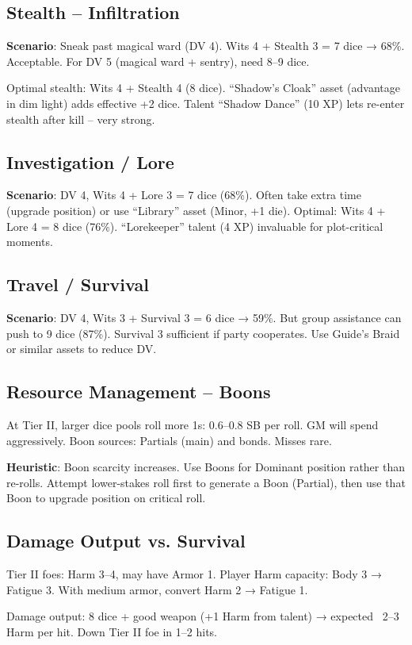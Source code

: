 \documentclass[11pt]{article}
\begin{document}
\subsection{Stealth – Infiltration}
\textbf{Scenario}: Sneak past magical ward (DV 4). Wits 4 + Stealth 3 = 7 dice → 68\%. Acceptable. For DV 5 (magical ward + sentry), need 8–9 dice.

Optimal stealth: Wits 4 + Stealth 4 (8 dice). ``Shadow's Cloak'' asset (advantage in dim light) adds effective +2 dice. Talent ``Shadow Dance'' (10 XP) lets re-enter stealth after kill – very strong.

\subsection{Investigation / Lore}
\textbf{Scenario}: DV 4, Wits 4 + Lore 3 = 7 dice (68\%). Often take extra time (upgrade position) or use ``Library'' asset (Minor, +1 die). Optimal: Wits 4 + Lore 4 = 8 dice (76\%). ``Lorekeeper'' talent (4 XP) invaluable for plot-critical moments.

\subsection{Travel / Survival}
\textbf{Scenario}: DV 4, Wits 3 + Survival 3 = 6 dice → 59\%. But group assistance can push to 9 dice (87\%). Survival 3 sufficient if party cooperates. Use Guide's Braid or similar assets to reduce DV.

\subsection{Resource Management – Boons}
At Tier II, larger dice pools roll more 1s: 0.6–0.8 SB per roll. GM will spend aggressively. Boon sources: Partials (main) and bonds. Misses rare.

\textbf{Heuristic}: Boon scarcity increases. Use Boons for Dominant position rather than re-rolls. Attempt lower-stakes roll first to generate a Boon (Partial), then use that Boon to upgrade position on critical roll.

\subsection{Damage Output vs. Survival}
Tier II foes: Harm 3–4, may have Armor 1. Player Harm capacity: Body 3 → Fatigue 3. With medium armor, convert Harm 2 → Fatigue 1.

Damage output: 8 dice + good weapon (+1 Harm from talent) → expected ~2–3 Harm per hit. Down Tier II foe in 1–2 hits.
\end{document}
